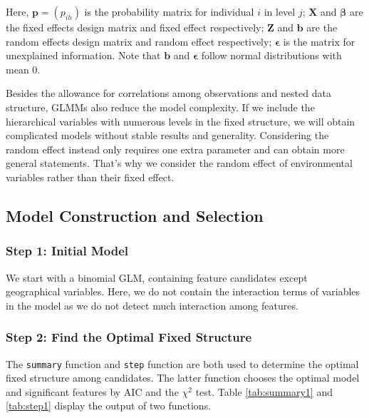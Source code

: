 \documentclass[11pt,twoside]{article}
\numberwithin{Theorem}{section}
\numberwithin{Definition}{section}
\numberwithin{Lemma}{section}
\numberwithin{Algorithm}{section}
\numberwithin{equation}{section}
\begin{document}
Here, $\boldsymbol{p} = (p_{ih})$ is the probability matrix for individual $i$ in level $j$; $\boldsymbol{X}$ and $\boldsymbol{\beta}$ are the fixed effects design matrix and fixed effect respectively; $\boldsymbol{Z}$ and $\boldsymbol{b}$ are the random effects design matrix and random effect respectively; $\boldsymbol{\epsilon}$ is the matrix for unexplained information. Note that $\boldsymbol{b}$ and $\boldsymbol{\epsilon}$ follow normal distributions with mean 0. 

Besides the allowance for correlations among observations and nested data structure, GLMMs also reduce the model complexity. If we include the hierarchical variables with numerous levels in the fixed structure, we will obtain complicated models without stable results and generality. Considering the random effect instead only requires one extra parameter and can obtain more general statements. That's why we consider the random effect of environmental variables rather than their fixed effect.

\subsection{Model Construction and Selection}

\subsubsection{Step 1: Initial Model}

We start with a binomial GLM, containing feature candidates except geographical variables. Here, we do not contain the interaction terms of variables in the model as we do not detect much interaction among features. 

\subsubsection{Step 2: Find the Optimal Fixed Structure}

The \texttt{summary} function and \texttt{step} function are both used to determine the optimal fixed structure among candidates. The latter function chooses the optimal model and significant features by AIC and the $\chi^2$ test. Table \ref{tab:summary1} and \ref{tab:step1} display the output of two functions.
\end{document}
